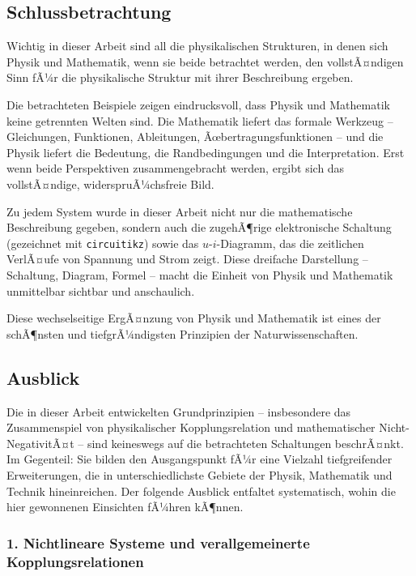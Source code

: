 ﻿\documentclass[12pt, a4paper]{article}
\begin{document}
	\subsection{Schlussbetrachtung}
	
	Wichtig in dieser Arbeit sind all die physikalischen Strukturen, in denen sich Physik und Mathematik, wenn sie beide betrachtet werden, den vollstÃ¤ndigen Sinn fÃ¼r die physikalische Struktur mit ihrer Beschreibung ergeben.
	
	Die betrachteten Beispiele zeigen eindrucksvoll, dass Physik und Mathematik keine getrennten Welten sind. Die Mathematik liefert das formale Werkzeug -- Gleichungen, Funktionen, Ableitungen, Ãœbertragungsfunktionen -- und die Physik liefert die Bedeutung, die Randbedingungen und die Interpretation. Erst wenn beide Perspektiven zusammengebracht werden, ergibt sich das vollstÃ¤ndige, widerspruÃ¼chsfreie Bild.
	
	Zu jedem System wurde in dieser Arbeit nicht nur die mathematische Beschreibung gegeben, sondern auch die zugehÃ¶rige elektronische Schaltung (gezeichnet mit \texttt{circuitikz}) sowie das $u$-$i$-Diagramm, das die zeitlichen VerlÃ¤ufe von Spannung und Strom zeigt. Diese dreifache Darstellung -- Schaltung, Diagram, Formel -- macht die Einheit von Physik und Mathematik unmittelbar sichtbar und anschaulich.
	
	Diese wechselseitige ErgÃ¤nzung von Physik und Mathematik ist eines der schÃ¶nsten und tiefgrÃ¼ndigsten Prinzipien der Naturwissenschaften.

	\subsection{Ausblick}

	Die in dieser Arbeit entwickelten Grundprinzipien -- insbesondere das Zusammenspiel von physikalischer Kopplungsrelation und mathematischer Nicht-NegativitÃ¤t -- sind keineswegs auf die betrachteten Schaltungen beschrÃ¤nkt. Im Gegenteil: Sie bilden den Ausgangspunkt fÃ¼r eine Vielzahl tiefgreifender Erweiterungen, die in unterschiedlichste Gebiete der Physik, Mathematik und Technik hineinreichen. Der folgende Ausblick entfaltet systematisch, wohin die hier gewonnenen Einsichten fÃ¼hren kÃ¶nnen.

	\subsubsection*{1. \quad Nichtlineare Systeme und verallgemeinerte Kopplungsrelationen}
\end{document}

